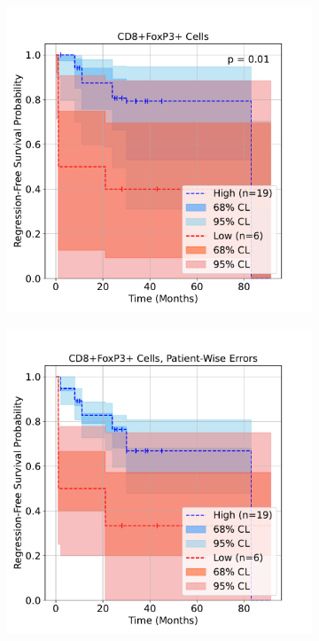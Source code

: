 \documentclass[article]{jss}
\begin{document}
\begin{figure}[ht]
  \newcommand{\spacebetweenrows}{1em}
  \newcommand{\figwidth}{0.32\textwidth}
  \centering
  \begin{subfigure}[t]{\figwidth}
    \centering
    \includegraphics[width=\linewidth]{lung_cells_km_RFS.pdf}
    \caption{\label{fig:lung-dataset-cells}}
  \end{subfigure}
  \begin{subfigure}[t]{\figwidth}
    \centering
    \includegraphics[width=\linewidth]{lung_cells_km_RFS_patient_wise.pdf}

\end{subfigure}
\end{figure}
\end{document}
